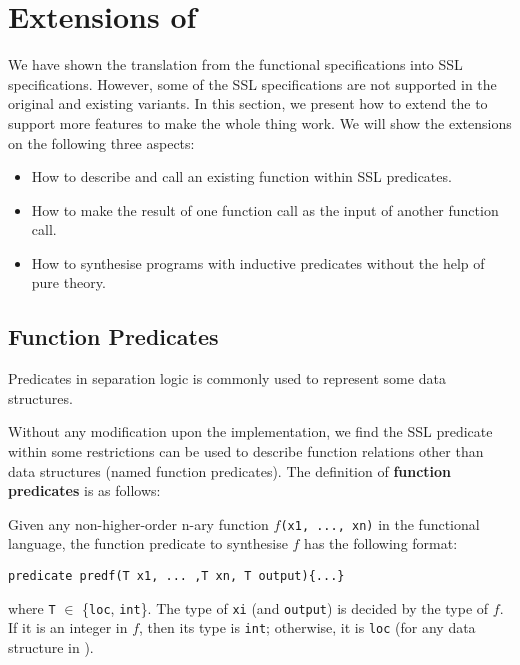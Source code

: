 \section{Extensions of \suslik}
\label{sec:suslik-extensions}

We have shown the translation from the functional specifications into
SSL specifications. However, some of the SSL specifications are not
supported in the original \suslik and existing variants.
%
In this section, we present how to extend the \suslik to support more
features to make the whole thing work. We will show the extensions on
the following three aspects:

\begin{itemize}
  \item How to describe and call an existing function within SSL predicates.
  \item How to make the result of one function call as the input of another function call.
  \item How to synthesise programs with inductive predicates without the help of pure theory.
\end{itemize}

\subsection{Function Predicates}
\label{sec:funcPred}

Predicates in separation logic is commonly used to represent some data structures.

Without any modification upon the implementation, we find the SSL
predicate within some restrictions can be used to describe function
relations other than data structures (named function predicates). The
definition of \textbf{function predicates} is as follows:

\begin{definition}
    \label{def:funcPred}
    \normalfont
    Given any non-higher-order n-ary function $f$\lstinline{(x1, ..., xn)} in the functional language, the function predicate to synthesise $f$ has the following format:
    \begin{lstlisting}[language=SynLang]
    predicate predf(T x1, ... ,T xn, T output){...}
    \end{lstlisting}
%
    where \lstinline{T} $\in$ \{\lstinline{loc}, \lstinline{int}\}.
    The type of \lstinline{xi} (and \lstinline{output}) is decided by
    the type of $f$. If it is an integer in $f$, then its type is
    \lstinline{int}; otherwise, it is \lstinline{loc} (for any data
    structure in \tool).
\end{definition}

